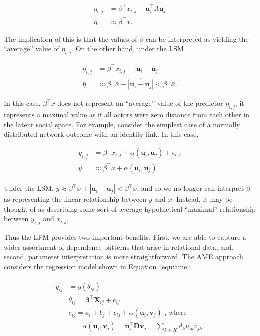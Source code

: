 \documentclass[12pt,pdflatex]{elsarticle}
\begin{document}
\begin{align*}
	\eta_{i,j} & =  \beta^\top x_{i,j} + \textbf{u}_{i}^{\top} \Lambda \textbf{u}_{j} \\
	\bar \eta & \approx  \beta^\top \bar x.
\end{align*}

The implication of this is that the values of $\beta$ can be interpreted as yielding the ``average'' value of $\eta_{i,j}$. On the other hand, under the LSM

\begin{align*}
	\eta_{i,j} & =  \beta^\top x_{i,j} - |\textbf{u}_{i} - \textbf{u}_{j}|  \\
	\bar \eta & \approx  \beta^\top \bar x - \overline{ |\textbf{u}_{i} - \textbf{u}_{j}| } <  \beta^\top \bar x .
\end{align*}

In this case, $\beta^\top \bar x$ does not represent an ``average'' value of the predictor $\eta_{i,j}$, it represents a maximal value as if all actors were zero distance from each other in the latent social space. For example, consider the simplest case of a normally distributed network  outcome with an identity link. In this case,

\begin{align*}
	y_{i,j} & = \beta^\top x_{i,j} + \alpha(\textbf{u}_{i}, \textbf{u}_{j}) + \epsilon_{i,j} \\
	\bar y & \approx \beta^\top \bar x + \overline{ \alpha(\textbf{u}_{i}, \textbf{u}_{j}) }   .
\end{align*}

Under the LSM, $\bar y \approx \beta^\top \bar x + \overline{ |\textbf{u}_{i} - \textbf{u}_{j}|  } < \beta^\top \bar x$, and so we no longer can interpret $\beta$ as representing the linear relationship between $y$ and $x$. Instead, it may be thought of as describing some sort of average hypothetical ``maximal'' relationship between $y_{i,j}$ and $x_{i,j}$.

Thus the LFM provides two important benefits. First, we are able to capture a wider assortment of dependence patterns that arise in relational data, and, second, parameter interpretation is more straightforward. The AME approach considers the regression model shown in Equation~\ref{eqn:ame}:

\begin{align}
\begin{aligned}
	y_{ij} &= g(\theta_{ij}) \\
	&\theta_{ij} = \bm\beta^{\top} \mathbf{X}_{ij} + e_{ij} \\
	&e_{ij} = a_{i} + b_{j}  + \epsilon_{ij} + \alpha(\textbf{u}_{i}, \textbf{v}_{j}) \text{  , where } \\
	&\qquad \alpha(\textbf{u}_{i}, \textbf{v}_{j}) = \textbf{u}_{i}^{\top} \textbf{D} \textbf{v}_{j} = \sum_{k \in K} d_{k} u_{ik} v_{jk}. \\
\label{eqn:ame}
\end{aligned}
\end{align}
\end{document}
